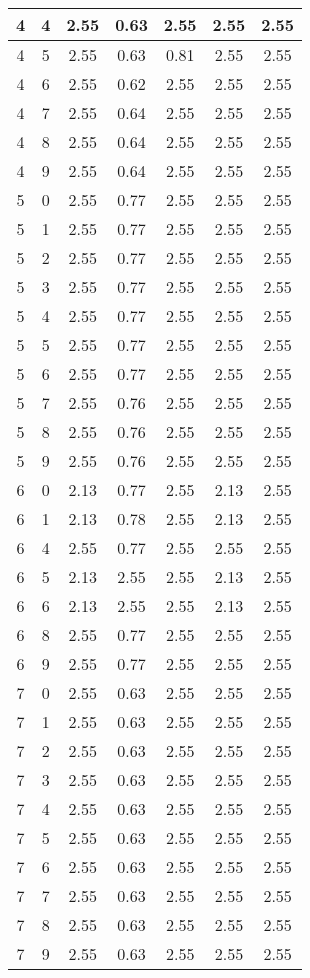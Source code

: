 \begin{longtable}{|c|c||c||c|c||c|c|}
	4 & 4 & 2.55 & 0.63 & 2.55 & 2.55 & 2.55 \\ \hline
	4 & 5 & 2.55 & 0.63 & 0.81 & 2.55 & 2.55 \\ \hline
	4 & 6 & 2.55 & 0.62 & 2.55 & 2.55 & 2.55 \\ \hline
	4 & 7 & 2.55 & 0.64 & 2.55 & 2.55 & 2.55 \\ \hline
	4 & 8 & 2.55 & 0.64 & 2.55 & 2.55 & 2.55 \\ \hline
	4 & 9 & 2.55 & 0.64 & 2.55 & 2.55 & 2.55 \\ \hline
	5 & 0 & 2.55 & 0.77 & 2.55 & 2.55 & 2.55 \\ \hline
	5 & 1 & 2.55 & 0.77 & 2.55 & 2.55 & 2.55 \\ \hline
	5 & 2 & 2.55 & 0.77 & 2.55 & 2.55 & 2.55 \\ \hline
	5 & 3 & 2.55 & 0.77 & 2.55 & 2.55 & 2.55 \\ \hline
	5 & 4 & 2.55 & 0.77 & 2.55 & 2.55 & 2.55 \\ \hline
	5 & 5 & 2.55 & 0.77 & 2.55 & 2.55 & 2.55 \\ \hline
	5 & 6 & 2.55 & 0.77 & 2.55 & 2.55 & 2.55 \\ \hline
	5 & 7 & 2.55 & 0.76 & 2.55 & 2.55 & 2.55 \\ \hline
	5 & 8 & 2.55 & 0.76 & 2.55 & 2.55 & 2.55 \\ \hline
	5 & 9 & 2.55 & 0.76 & 2.55 & 2.55 & 2.55 \\ \hline
	6 & 0 & 2.13 & 0.77 & 2.55 & 2.13 & 2.55 \\ \hline
	6 & 1 & 2.13 & 0.78 & 2.55 & 2.13 & 2.55 \\ \hline
	6 & 4 & 2.55 & 0.77 & 2.55 & 2.55 & 2.55 \\ \hline
	6 & 5 & 2.13 & 2.55 & 2.55 & 2.13 & 2.55 \\ \hline
	6 & 6 & 2.13 & 2.55 & 2.55 & 2.13 & 2.55 \\ \hline
	6 & 8 & 2.55 & 0.77 & 2.55 & 2.55 & 2.55 \\ \hline
	6 & 9 & 2.55 & 0.77 & 2.55 & 2.55 & 2.55 \\ \hline
	7 & 0 & 2.55 & 0.63 & 2.55 & 2.55 & 2.55 \\ \hline
	7 & 1 & 2.55 & 0.63 & 2.55 & 2.55 & 2.55 \\ \hline
	7 & 2 & 2.55 & 0.63 & 2.55 & 2.55 & 2.55 \\ \hline
	7 & 3 & 2.55 & 0.63 & 2.55 & 2.55 & 2.55 \\ \hline
	7 & 4 & 2.55 & 0.63 & 2.55 & 2.55 & 2.55 \\ \hline
	7 & 5 & 2.55 & 0.63 & 2.55 & 2.55 & 2.55 \\ \hline
	7 & 6 & 2.55 & 0.63 & 2.55 & 2.55 & 2.55 \\ \hline
	7 & 7 & 2.55 & 0.63 & 2.55 & 2.55 & 2.55 \\ \hline
	7 & 8 & 2.55 & 0.63 & 2.55 & 2.55 & 2.55 \\ \hline
	7 & 9 & 2.55 & 0.63 & 2.55 & 2.55 & 2.55 \\ \hline
\end{longtable}
